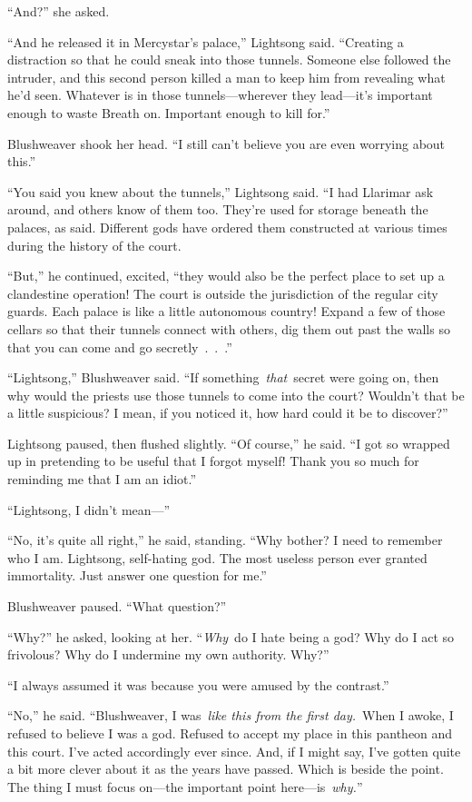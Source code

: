 “And?” she asked.

“And he released it in Mercystar’s palace,” Lightsong said. “Creating a distraction so that he could sneak into those tunnels. Someone else followed the intruder, and this second person killed a man to keep him from revealing what he’d seen. Whatever is in those tunnels—wherever they lead—it’s important enough to waste Breath on. Important enough to kill for.”

Blushweaver shook her head. “I still can’t believe you are even worrying about this.”

“You said you knew about the tunnels,” Lightsong said. “I had Llarimar ask around, and others know of them too. They’re used for storage beneath the palaces, as said. Different gods have ordered them constructed at various times during the history of the court.

“But,” he continued, excited, “they would also be the perfect place to set up a clandestine operation! The court is outside the jurisdiction of the regular city guards. Each palace is like a little autonomous country! Expand a few of those cellars so that their tunnels connect with others, dig them out past the walls so that you can come and go secretly~.~.~.”

“Lightsong,” Blushweaver said. “If something~\textit{that}~secret were going on, then why would the priests use those tunnels to come into the court? Wouldn’t that be a little suspicious? I mean, if you noticed it, how hard could it be to discover?”

Lightsong paused, then flushed slightly. “Of course,” he said. “I got so wrapped up in pretending to be useful that I forgot myself! Thank you so much for reminding me that I am an idiot.”

“Lightsong, I didn’t mean—”

“No, it’s quite all right,” he said, standing. “Why bother? I need to remember who I am. Lightsong, self-hating god. The most useless person ever granted immortality. Just answer one question for me.”

Blushweaver paused. “What question?”

“Why?” he asked, looking at her. “\textit{Why}~do I hate being a god? Why do I act so frivolous? Why do I undermine my own authority. Why?”

“I always assumed it was because you were amused by the contrast.”

“No,” he said. “Blushweaver, I was~\textit{like this from the first day.}~When I awoke, I refused to believe I was a god. Refused to accept my place in this pantheon and this court. I’ve acted accordingly ever since. And, if I might say, I’ve gotten quite a bit more clever about it as the years have passed. Which is beside the point. The thing I must focus on—the important point here—is~\textit{why.}”

